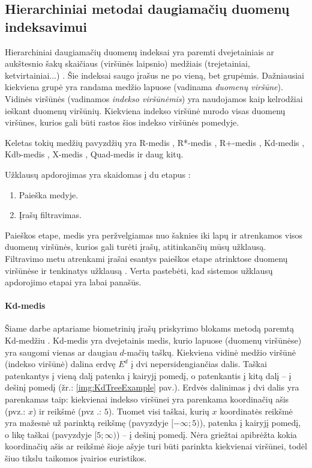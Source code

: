 \subsection{Hierarchiniai metodai daugiamačių duomenų indeksavimui}
\label{sec:HierarchicalIndices}

Hierarchiniai daugiamačių duomenų indeksai yra paremti dvejetainiais ar aukštesnio šakų skaičiaus (viršūnės laipsnio) medžiais (trejetainiai, ketvirtainiai...) \cite{gaede1998multidimensional}.
Šie indeksai saugo įrašus ne po vieną, bet grupėmis.
Dažniausiai kiekviena grupė yra randama medžio lapuose (vadinama {\it duomenų viršūne}).
Vidinės viršūnės (vadinamos {\it indekso viršūnėmis}) yra naudojamos kaip kelrodžiai ieškant duomenų viršūnių.
Kiekviena indekso viršūnė nurodo visas duomenų viršūnes, kurios gali būti rastos šios indekso viršūnės pomedyje.

Keletas tokių medžių pavyzdžių yra R-medis \cite{guttman1984r}, R*-medis \cite{beckmann1990r}, R+-medis \cite{sellis1987r+}, Kd-medis \cite{bentley1979multidimensional}, Kdb-medis \cite{robinson1981kdb}, X-medis \cite{berchtold1996x}, Quad-medis \cite{habenicht1983quad} ir daug kitų.

Užklausų apdorojimas yra skaidomas į du etapus \cite{bohm2001searching}:
\begin{enumerate}
	\item Paieška medyje.
	\item Įrašų filtravimas.
\end{enumerate}
Paieškos etape, medis yra peržvelgiamas nuo šaknies iki lapų ir atrenkamos visos duomenų viršūnės, kurios gali turėti įrašų, atitinkančių mūsų užklausą.
Filtravimo metu atrenkami įrašai esantys paieškos etape atrinktose duomenų viršūnėse ir tenkinatys užklausą \cite{brinkhoff1994multi} \cite{bohm2001searching}.
Verta pastebėti, kad sistemos \cite{NeurotechnologyMegamatcherAccelerator} užklausų apdorojimo etapai yra labai panašūs.

\paragraph{Kd-medis}
\label{sec:Kd-tree}

Šiame darbe aptariame biometrinių įrašų priskyrimo blokams metodą paremtą Kd-medžiu \cite{bentley1979multidimensional}.
Kd-medis yra dvejetainis medis, kurio lapuose (duomenų viršūnėse) yra saugomi vienas ar daugiau $d$-mačių taškų.
Kiekviena vidinė medžio viršūnė (indekso viršūnė) dalina erdvę $E^d$ į dvi nepersidengiančias dalis.
Taškai patenkantys į vieną dalį patenka į kairyjį pomedį, o patenkantis į kitą dalį -- į dešinį pomedį (žr.: \ref{img:KdTreeExample} pav.).
Erdvės dalinimas į dvi dalis yra parenkamas taip: kiekvienai indekso viršūnei yra parenkama koordinačių ašis (pvz.: $x$) ir reikšmė (pvz .: $5$).
Tuomet visi taškai, kurių $x$ koordinatės reikšmė yra mažesnė už parinktą reikšmę (pavyzdyje $[-\infty; 5)$), patenka į kairyjį pomedį, o likę taškai (pavyzdyje $[5; \infty)$) -- į dešinį pomedį.
Nėra griežtai apibrėžta kokia koordinačių ašis ar reikšmė šioje ašyje turi būti parinkta kiekvienai viršūnei, todėl šiuo tikslu taikomos įvairios euristikos.

